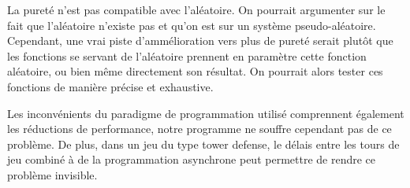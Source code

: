 \documentclass{article}
\begin{document}
La pureté n'est pas compatible avec l'aléatoire. On pourrait argumenter sur le fait que l'aléatoire n'existe pas et qu'on est sur un système pseudo-aléatoire. Cependant, une vrai piste d'ammélioration vers plus de pureté serait plutôt que les fonctions se servant de l'aléatoire prennent en paramètre cette fonction aléatoire, ou bien même directement son résultat. On pourrait alors tester ces fonctions de manière précise et exhaustive.

Les inconvénients du paradigme de programmation utilisé comprennent également les réductions de performance, notre programme ne souffre cependant pas de ce problème. De plus, dans un jeu du type tower defense, le délais entre les tours de jeu combiné à de la programmation asynchrone peut permettre de rendre ce problème invisible.
\end{document}
